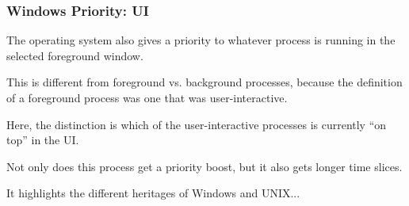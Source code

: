 \begin{frame}
\frametitle{Windows Priority: UI}

The operating system also gives a priority to whatever process is running in the selected foreground window. 

This is different from foreground vs. background processes, because the definition of a foreground process was one that was user-interactive. 

Here, the distinction is which of the user-interactive processes is currently ``on top'' in the UI. 

Not only does this process get a priority boost, but it also gets longer time slices. 

It highlights the different heritages of Windows and UNIX...

\end{frame}





